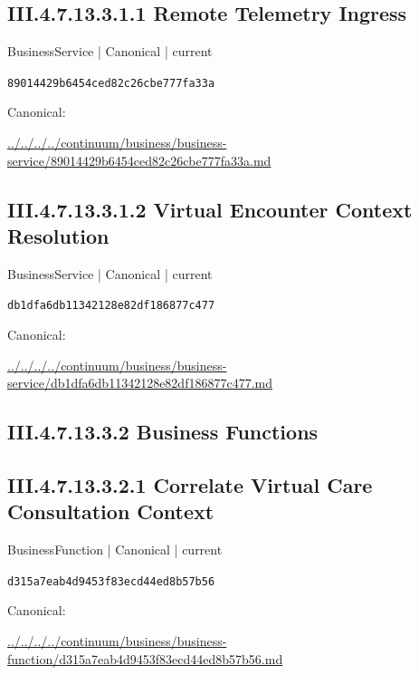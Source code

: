\documentclass[10pt,a4paper]{article}
\begin{document}
\subsection*{III.4.7.13.3.1.1 Remote Telemetry Ingress}
\label{element-89014429b6454ced82c26cbe777fa33a}
{\small BusinessService | Canonical | current}\par
\texttt{89014429b6454ced82c26cbe777fa33a}\par
Canonical: \par
{\footnotesize\url{../../../../continuum/business/business-service/89014429b6454ced82c26cbe777fa33a.md}}\par
\subsection*{III.4.7.13.3.1.2 Virtual Encounter Context Resolution}
\label{element-db1dfa6db11342128e82df186877c477}
{\small BusinessService | Canonical | current}\par
\texttt{db1dfa6db11342128e82df186877c477}\par
Canonical: \par
{\footnotesize\url{../../../../continuum/business/business-service/db1dfa6db11342128e82df186877c477.md}}\par
\subsection*{III.4.7.13.3.2 Business Functions}
\subsection*{III.4.7.13.3.2.1 Correlate Virtual Care Consultation Context}
\label{element-d315a7eab4d9453f83ecd44ed8b57b56}
{\small BusinessFunction | Canonical | current}\par
\texttt{d315a7eab4d9453f83ecd44ed8b57b56}\par
Canonical: \par
{\footnotesize\url{../../../../continuum/business/business-function/d315a7eab4d9453f83ecd44ed8b57b56.md}}\par
\end{document}
